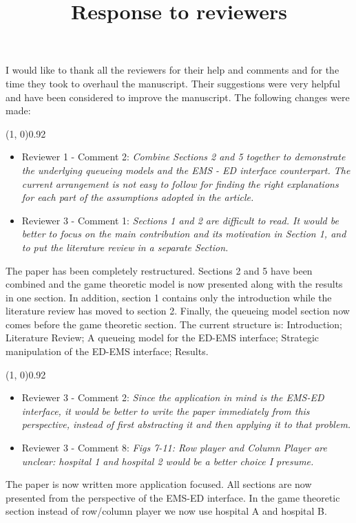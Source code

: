 \documentclass{article}
\title{Response to reviewers}
\author{}
\begin{document}
    \maketitle

    I would like to thank all the reviewers for their help and comments and for
    the time they took to overhaul the manuscript.
    Their suggestions were very helpful and have been considered to improve the
    manuscript.
    The following changes were made:


    \line(1, 0){0.92\textwidth}
    \begin{itemize}
        \item Reviewer 1 - Comment 2: \textit{Combine Sections 2 and 5
        together to demonstrate the underlying queueing models and the
        EMS - ED interface counterpart.
        The current arrangement is not easy to follow for finding the right
        explanations for each part of the assumptions adopted in the
        article.}

        \item Reviewer 3 - Comment 1: \textit{Sections 1 and 2 are
        difficult to read.
        It would be better to focus on the main contribution and its
        motivation in Section 1, and to put the literature review in a
        separate Section.}
    \end{itemize}
    The paper has been completely restructured.
    Sections 2 and 5 have been combined and the game theoretic model is now
    presented along with the results in one section.
    In addition, section 1 contains only the introduction while the
    literature review has moved to section 2.
    Finally, the queueing model section now comes before the game theoretic
    section.
    The current structure is: Introduction; Literature Review; A queueing
    model for the ED-EMS interface; Strategic manipulation of the ED-EMS
    interface; Results.

    \line(1, 0){0.92\textwidth}
    \begin{itemize}
        \item Reviewer 3 - Comment 2: \textit{Since the application in mind
        is the EMS-ED interface, it would be better to write the paper
        immediately from this perspective, instead of first abstracting it
        and then applying it to that problem.}
        \item Reviewer 3 - Comment 8: \textit{Figs 7-11: Row player and
        Column Player are unclear: hospital 1 and hospital 2 would be a
        better choice I presume.}
    \end{itemize}
    The paper is now written more application focused.
    All sections are now presented from the perspective of the EMS-ED
    interface.
    In the game theoretic section instead of row/column player we now use
    hospital A and hospital B.
\end{document}
